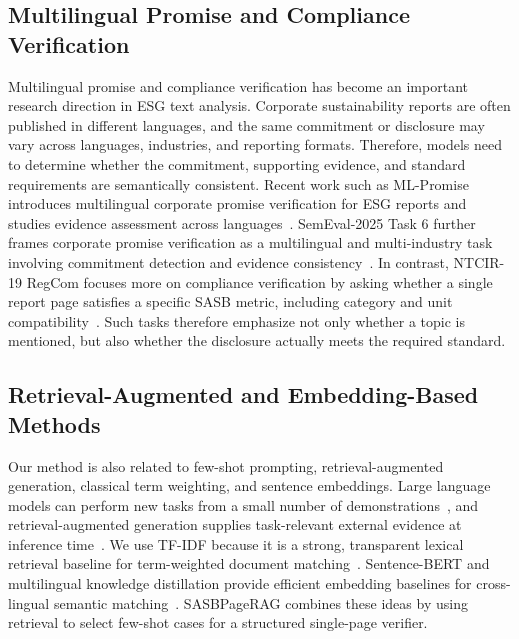 \documentclass[sigconf,article]{acmart}
\newcommand{\SASBPageRAG}{SASB\-Page\-RAG}
\newcommand{\retraug}{retrieval\allowbreak-augmented}
\begin{document}
\subsection{Multilingual Promise and Compliance Verification}
Multilingual promise and compliance verification has become an important research direction in ESG text analysis. Corporate sustainability reports are often published in different languages, and the same commitment or disclosure may vary across languages, industries, and reporting formats. Therefore, models need to determine whether the commitment, supporting evidence, and standard requirements are semantically consistent. Recent work such as ML-Promise introduces multilingual corporate promise verification for ESG reports and studies evidence assessment across languages~\cite{seki2025mlpromise}. SemEval-2025 Task 6 further frames corporate promise verification as a multilingual and multi-industry task involving commitment detection and evidence consistency~\cite{chen2025semeval}. In contrast, NTCIR-19 RegCom focuses more on compliance verification by asking whether a single report page satisfies a specific SASB metric, including category and unit compatibility~\cite{ntcir19regcom}. Such tasks therefore emphasize not only whether a topic is mentioned, but also whether the disclosure actually meets the required standard.

\subsection{Retrieval-Augmented and Embedding-Based Methods}
Our method is also related to few-shot prompting, \retraug{} generation, classical term weighting, and sentence embeddings. Large language models can perform new tasks from a small number of demonstrations~\cite{brown2020language}, and \retraug{} generation supplies task-relevant external evidence at inference time~\cite{lewis2020retrieval}. We use TF-IDF because it is a strong, transparent lexical retrieval baseline for term-weighted document matching~\cite{salton1988term}. Sentence-BERT and multilingual knowledge distillation provide efficient embedding baselines for cross-lingual semantic matching~\cite{reimers2019sentencebert,reimers2020multilingual}. \SASBPageRAG{} combines these ideas by using retrieval to select few-shot cases for a structured single-page verifier.
\end{document}
